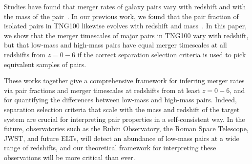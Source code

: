 \documentclass[twocolumn,linenumbers]{aastex631}
\begin{document}
    Studies have found that merger rates of galaxy pairs vary with redshift and with the mass of the pair~\citep{Stewart2009,Hopkins2010a,RG2015}.
    In our previous work, we found that the pair fraction of isolated pairs in TNG100 likewise evolves with redshift and mass~\citep{Chamberlain2024}. 
    In this paper, we show that the merger timescales of major pairs in TNG100 vary with redshift, but that low-mass and high-mass pairs have equal merger timescales at all redshifts from $z=0-6$ if the correct separation selection criteria is used to pick equivalent samples of pairs.
    
    These works together give a comprehensive framework for inferring merger rates via pair fractions and merger timescales at redshifts from at least $z=0-6$, and for quantifying the differences between low-mass and high-mass pairs.
    Indeed, separation selection criteria that scale with the mass and redshift of the target system are crucial for interpreting pair properties in a self-consistent way. 
    In the future, observatories such as the Rubin Observatory, the Roman Space Telescope, JWST, and future ELTs, will detect an abundance of low-mass pairs at a wide range of redshifts, and our theoretical framework for interpreting these observations will be more critical than ever. 










{}

\end{document}
